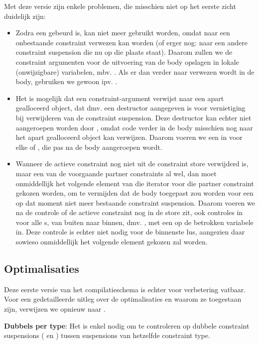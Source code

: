 Met deze versie zijn enkele problemen, die misschien niet op het eerste zicht duidelijk zijn: \begin{itemize}
  \item Zodra een  gebeurd is, kan  niet meer gebruikt worden, omdat naar een onbestaande constraint verwezen kan worden (of erger nog: naar een andere constraint suspension die nu op die plaats staat). Daarom zullen we de constraint argumenten voor de uitvoering van de body opslagen in lokale (onwijzigbare) variabelen, mbv. . Als er dan verder naar verwezen wordt in de body, gebruiken we gewoon  ipv. .
  \item Het is mogelijk dat een constraint-argument verwijst naar een apart gealloceerd object, dat dmv. een destructor aangegeven is voor vernietiging bij verwijderen van de constraint suspension. Deze destructor kan echter niet aangeroepen worden door , omdat code verder in de body misschien nog naar het apart gealloceerd object kan verwijzen. Daarom voeren we een  in voor elke  of , die pas na de body aangeroepen wordt.
  \item Wanneer de actieve constraint nog niet uit de constraint store verwijderd is, maar een van de voorgaande partner constraints al wel, dan moet onmiddellijk het volgende element van die iterator voor die partner constraint gekozen worden, om te vermijden dat de body toegepast zou worden voor een op dat moment niet meer bestaande constraint suspension. Daarom voeren we na de controle of de actieve constraint nog in de store zit, ook controles in voor alle s, van buiten naar binnen, dmv. , met een  op de betrokken variabele in. Deze controle is echter niet nodig voor de binnenste lus, aangezien daar sowieso onmiddellijk het volgende element gekozen zal worden.
\end{itemize}

\subsection{Optimalisaties}

Deze eerste versie van het compilatieschema is echter voor verbetering vatbaar. Voor een gedetailleerde uitleg over de optimalisaties en waarom ze toegestaan zijn, verwijzen we opnieuw naar \cite{tomsphdthesis}. 

{\bf Dubbels per type}: Het is enkel nodig om te controleren op dubbele constraint suspensions ( en ) tussen suspensions van hetzelfde constraint type.

